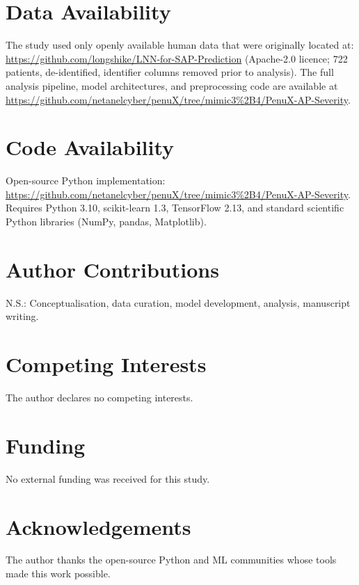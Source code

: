 \documentclass[12pt,a4paper]{article}
\begin{document}
\section*{Data Availability}

The study used only openly available human data that were originally located at: \url{https://github.com/longshike/LNN-for-SAP-Prediction} (Apache-2.0 licence; 722 patients, de-identified, identifier columns removed prior to analysis). The full analysis pipeline, model architectures, and preprocessing code are available at \url{https://github.com/netanelcyber/penuX/tree/mimic3%2B4/PenuX-AP-Severity}.

\section*{Code Availability}

Open-source Python implementation: \url{https://github.com/netanelcyber/penuX/tree/mimic3%2B4/PenuX-AP-Severity}. Requires Python 3.10, scikit-learn 1.3, TensorFlow 2.13, and standard scientific Python libraries (NumPy, pandas, Matplotlib).

\section*{Author Contributions}

N.S.: Conceptualisation, data curation, model development, analysis, manuscript writing.

\section*{Competing Interests}

The author declares no competing interests.

\section*{Funding}

No external funding was received for this study.

\section*{Acknowledgements}

The author thanks the open-source Python and ML communities whose tools made this work possible.

\clearpage

\end{document}
